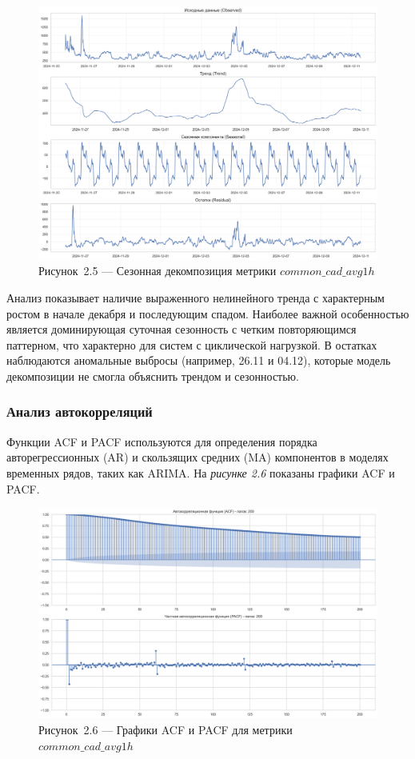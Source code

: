 \begin{figure}[H]
	\centering
	\includegraphics[width=\textwidth]{figures/chapter2/seasonal_decomposition.png}
	\caption*{Рисунок~2.5 --- Сезонная декомпозиция метрики $common\_cad\_avg1h$}
	\label{fig:seasonal_decomposition}
\end{figure}

Анализ показывает наличие выраженного нелинейного тренда с характерным ростом в начале декабря и последующим спадом. Наиболее важной особенностью является доминирующая суточная сезонность с четким повторяющимся паттерном, что характерно для систем с циклической нагрузкой. В остатках наблюдаются аномальные выбросы (например, 26.11 и 04.12), которые модель декомпозиции не смогла объяснить трендом и сезонностью.

\subsubsection{Анализ автокорреляций}

Функции ACF и PACF используются для определения порядка авторегрессионных (AR) и скользящих средних (MA) компонентов в моделях временных рядов, таких как ARIMA. На \textit{рисунке 2.6} показаны графики ACF и PACF.

\begin{figure}[H]
	\centering
	\includegraphics[width=\textwidth]{figures/chapter2/acf_pacf_plots.png}
	\caption*{Рисунок~2.6 --- Графики ACF и PACF для метрики $common\_cad\_avg1h$}
	\label{fig:acf_pacf}
\end{figure}

